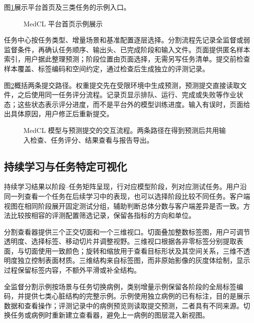 图\ref{fig:medcl-homepage-ui}展示平台首页及三类任务的示例入口。
\begin{figure}[htbp]
\centering
{}
\caption{MedCL 平台首页示例展示}
\label{fig:medcl-homepage-ui}
\end{figure}

任务中心按任务类型、增量场景和基准配置逐层选择。分割流程先记录全监督或弱监督条件，再确认任务顺序、输出头、已完成阶段和输入文件。页面提供匿名样本索引，用户据此整理预测；阶段位置由页面选择，无需另写任务清单。提交前检查样本覆盖、标签编码和空间约定，通过检查后生成独立的评测记录。

图\ref{fig:medcl-workflow-design}概括两条提交路径。权重提交先在受限环境中生成预测，预测提交直接读取文件，之后使用同一任务评分流程。记录页显示排队、运行、完成或失败等作业状态；这些状态表示评分进度，而不是平台外的模型训练进度。输入有误时，页面给出具体原因，用户修正后重新提交。

\begin{figure}[htbp]
\centering
\resizebox{\thesisfigurewidth}{!}{}
\caption[MedCL 模型与预测提交的交互流程]{MedCL 模型与预测提交的交互流程。两条路径在得到预测后共用输入检查、任务评分、结果查看与报告导出。}
\label{fig:medcl-workflow-design}
\end{figure}


\subsection{持续学习与任务特定可视化}
\label{subsec:medcl-visualization}

持续学习结果以阶段--任务矩阵呈现，行对应模型阶段，列对应测试任务。用户沿同一列查看一个任务在后续学习中的表现，也可以选择阶段比较不同任务。客户端视图在相同阶段展开固定测试分组，辅助判断总体分数与客户端差异是否一致。方法比较按相容的评测配置筛选记录，保留各指标的方向和单位。


分割查看器提供三个正交切面和一个三维视口。切面叠加整数标签图，用户可调节透明度、选择标签、移动切片并调整视野。三维视口根据各非零标签分别提取表面，与切面使用一致颜色；旋转和缩放用于查看目标形状及其空间关系，三维不透明度独立控制表面材质。三维结构来自标签图，而非原始影像的灰度体绘制，显示过程保留标签内容，不额外平滑或补全结构。

全监督分割示例按场景与任务切换病例，类别增量示例保留各阶段的全局标签编码，并提供七类心脏结构的完整示例。示例使用独立病例的已有标注，目的是展示数据和查看操作；评测记录中的病例预览则读取提交预测，二者具有不同来源。切换任务或病例时重新建立查看器，避免上一病例的图层混入新视图。



